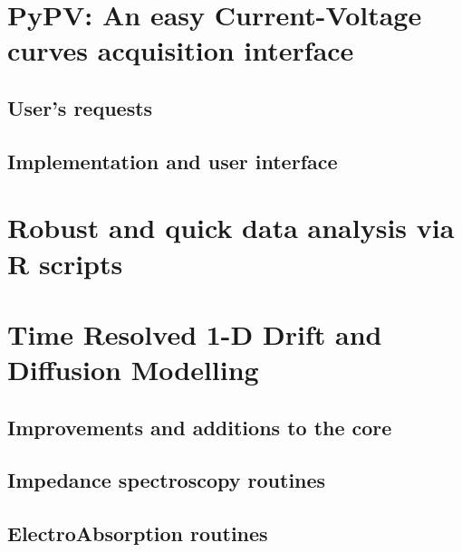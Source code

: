 
\section{PyPV: An easy Current-Voltage curves acquisition interface}
	\subsection{User's requests}
	\subsection{Implementation and user interface}
	
\section{Robust and quick data analysis via R scripts}

\section{Time Resolved 1-D Drift and Diffusion Modelling}
	\subsection{Improvements and additions to the core}
	\subsection{Impedance spectroscopy routines}
	\subsection{ElectroAbsorption routines}

